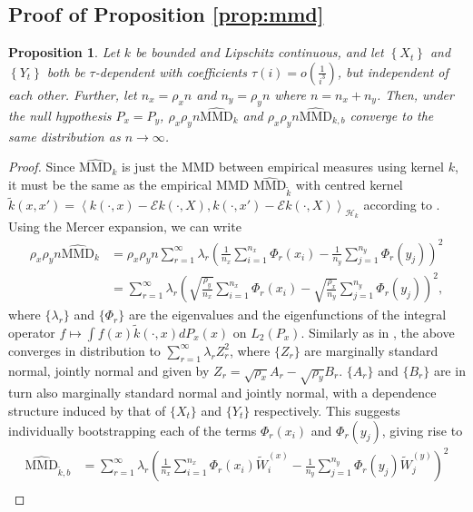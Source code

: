 \documentclass{article} %
\newtheorem{proposition}{Proposition}
\newcommand{\ev}{\mathcal{E}}
\newcommand{\Hk}{\ensuremath{\mathcal{H}_k}}%
\begin{document}
  \subsection{Proof of Proposition \ref{prop:mmd} }
  \begin{proposition}
 Let $k$ be bounded and Lipschitz continuous, and let $\left\{ X_t \right\}$ and $\left\{ Y_t \right\}$ 
 both be $\tau$-dependent with coefficients $\tau(i) = o(\frac{1}{i^3})$, but independent of each other. Further, let $n_x=\rho_x n$ and $n_y=\rho_y n$ where $n=n_x+n_y$. Then, under the null hypothesis $P_x=P_y$, $\rho_x \rho_y n\widehat{\text{MMD}}_k$ and $\rho_x \rho_y n\widehat{\text{MMD}}_{k,b}$ converge to the same distribution as $n\to\infty$.
\end{proposition}
  \begin{proof}
  Since $\widehat{\text{MMD}}_k$ is just the MMD between empirical measures
using kernel $k$, it must be the same as the empirical MMD $\widehat{\text{MMD}}_{\tilde k}$ with centred kernel $\tilde{k}(x,x')=\left \langle k(\cdot,x)-\ev k(\cdot,X), k(\cdot,x')-\ev k(\cdot,X) \right \rangle_{\Hk}$ according to \cite[Theorem 22]{SejSriGreFuk13}. Using the Mercer expansion, we can write
\begin{align*}
\rho_x \rho_y n\widehat{\text{MMD}}_k & = \rho_{x}\rho_{y}n\sum_{r=1}^{\infty}\lambda_{r}\left(\frac{1}{n_{x}}\sum_{i=1}^{n_{x}}\Phi_{r}(x_{i})-\frac{1}{n_{y}}\sum_{j=1}^{n_{y}}\Phi_{r}(y_{j})\right)^{2}\\
 & = \sum_{r=1}^{\infty}\lambda_{r}\left(\sqrt{\frac{\rho_{y}}{n_{x}}}\sum_{i=1}^{n_{x}}\Phi_{r}(x_{i})-\sqrt{\frac{\rho_{x}}{n_{y}}}\sum_{j=1}^{n_{y}}\Phi_{r}(y_{j})\right)^{2},
\end{align*}
where $\{\lambda_r\}$ and $\{\Phi_r\}$ are the eigenvalues and the eigenfunctions of the integral operator $f\mapsto \int f(x)\tilde k(\cdot,x)dP_x(x)$ on $L_2(P_x)$. Similarly as in \cite[Theorem 2.1]{leucht_dependent_2013}, the above converges in distribution to $\sum_{r=1}^\infty \lambda_r Z_r^2$, where $\{Z_r\}$ are marginally standard normal, jointly normal and given by $Z_r=\sqrt{\rho_x}A_r-\sqrt{\rho_y}B_r$. $\{A_r\}$ and $\{B_r\}$ are in turn also marginally standard normal and jointly normal, with a dependence structure induced by that of $\{X_t\}$ and $\{Y_t\}$ respectively. This suggests individually bootstrapping each of the terms $\Phi_{r}(x_{i})$ and $\Phi_{r}(y_{j})$, giving rise to 
\begin{align*}
\widehat{\text{MMD}}_{\tilde k, b}&=\sum_{r=1}^{\infty}\lambda_{r}\left(\frac{1}{n_{x}}\sum_{i=1}^{n_{x}}\Phi_{r}(x_{i})\tilde W_i^{(x)}-\frac{1}{n_{y}}\sum_{j=1}^{n_{y}}\Phi_{r}(y_{j})\tilde W_j^{(y)}\right)^{2}\\

\end{align*}
\end{proof}
\end{document}
